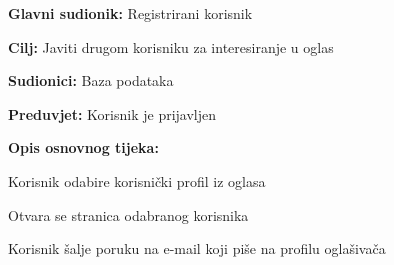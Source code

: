 				\noindent {}
					\begin{packed_item}
	
						\item \textbf{Glavni sudionik: }Registrirani korisnik
						\item  \textbf{Cilj:} Javiti drugom korisniku za interesiranje u oglas
						\item  \textbf{Sudionici:} Baza podataka
						\item  \textbf{Preduvjet:} Korisnik je prijavljen
						\item  \textbf{Opis osnovnog tijeka:}
						
						\item[] \begin{packed_enum}
	
							\item Korisnik odabire korisnički profil iz oglasa
							\item Otvara se stranica odabranog korisnika
							\item Korisnik šalje poruku na e-mail koji piše na profilu oglašivača

						\end{packed_enum}						
					\end{packed_item}
					
